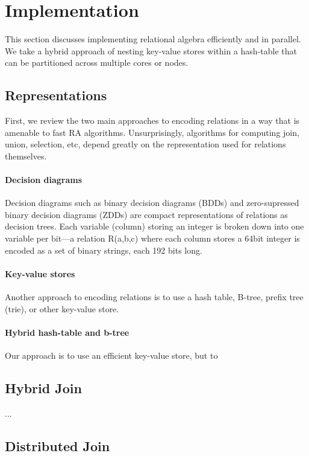

\section{Implementation}
\label{sec:impl}
%
This section discusses implementing relational algebra efficiently and in parallel. We take a hybrid approach of nesting key-value stores within a hash-table that can be partitioned across multiple cores or nodes. 


\subsection{Representations}

First, we review the two main approaches to encoding relations in a way that is amenable to fast RA algorithms. Unsurprisingly, algorithms for computing join, union, selection, etc, depend greatly on the representation used for relations themselves.

\paragraph{Decision diagrams} Decision diagrams such as binary decision diagrams (BDDs) and zero-supressed binary decision diagrams (ZDDs) are compact representations of relations as decision trees. Each variable (column) storing an integer is broken down into one variable per bit---a relation R(a,b,c) where each column stores a 64bit integer is encoded as a set of binary strings, each 192 bits long.  


\paragraph{Key-value stores} Another approach to encoding relations is to use a hash table, B-tree, prefix tree (trie), or other key-value store.


\paragraph{Hybrid hash-table and b-tree} Our approach is to use an efficient key-value store, but to



\subsection{Hybrid Join}

...

\subsection{Distributed Join}

